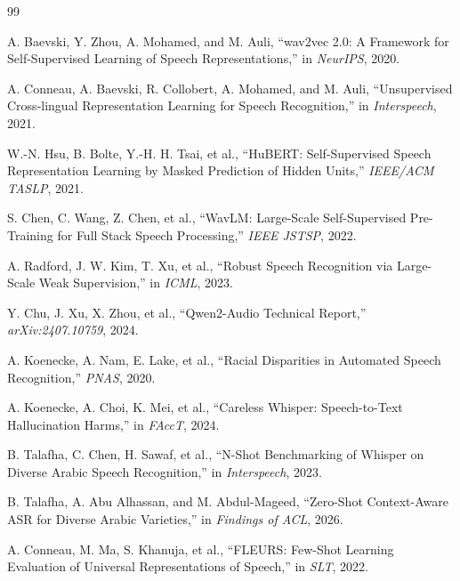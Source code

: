 \documentclass[11pt,a4paper]{article}
\begin{document}

\begin{thebibliography}{99}

A. Baevski, Y. Zhou, A. Mohamed, and M. Auli,
``wav2vec 2.0: A Framework for Self-Supervised Learning of Speech Representations,''
in \textit{NeurIPS}, 2020.

A. Conneau, A. Baevski, R. Collobert, A. Mohamed, and M. Auli,
``Unsupervised Cross-lingual Representation Learning for Speech Recognition,''
in \textit{Interspeech}, 2021.

W.-N. Hsu, B. Bolte, Y.-H. H. Tsai, et al.,
``HuBERT: Self-Supervised Speech Representation Learning by Masked Prediction of Hidden Units,''
\textit{IEEE/ACM TASLP}, 2021.

S. Chen, C. Wang, Z. Chen, et al.,
``WavLM: Large-Scale Self-Supervised Pre-Training for Full Stack Speech Processing,''
\textit{IEEE JSTSP}, 2022.

A. Radford, J. W. Kim, T. Xu, et al.,
``Robust Speech Recognition via Large-Scale Weak Supervision,''
in \textit{ICML}, 2023.

Y. Chu, J. Xu, X. Zhou, et al.,
``Qwen2-Audio Technical Report,''
\textit{arXiv:2407.10759}, 2024.

A. Koenecke, A. Nam, E. Lake, et al.,
``Racial Disparities in Automated Speech Recognition,''
\textit{PNAS}, 2020.

A. Koenecke, A. Choi, K. Mei, et al.,
``Careless Whisper: Speech-to-Text Hallucination Harms,''
in \textit{FAccT}, 2024.

B. Talafha, C. Chen, H. Sawaf, et al.,
``N-Shot Benchmarking of Whisper on Diverse Arabic Speech Recognition,''
in \textit{Interspeech}, 2023.

B. Talafha, A. Abu Alhassan, and M. Abdul-Mageed,
``Zero-Shot Context-Aware ASR for Diverse Arabic Varieties,''
in \textit{Findings of ACL}, 2026.

A. Conneau, M. Ma, S. Khanuja, et al.,
``FLEURS: Few-Shot Learning Evaluation of Universal Representations of Speech,''
in \textit{SLT}, 2022.


\end{thebibliography}
\end{document}
